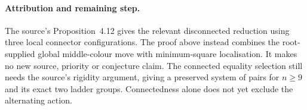 \documentclass[11pt,a4paper]{article}
\begin{document}
\paragraph{Attribution and remaining step.}
The source's Proposition~4.12 gives the relevant disconnected
reduction using three local connector configurations. The proof
above instead combines the root-supplied global middle-colour move
with minimum-square localisation. It makes no new source, priority
or conjecture claim. The connected equality selection still needs
the source's rigidity argument, giving a preserved system of pairs
for $n\geq9$ and its exact two ladder groups. Connectedness alone
does not yet exclude the alternating action.
\end{document}
